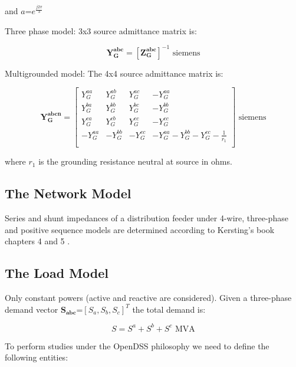\documentclass[12pt]{article}
\begin{document}
and $a$=$e^{\frac{j 2  \pi}{3}}$

Three phase model: 3x3 source admittance matrix is:

\begin{equation}
\mathbf{Y^{abc}_{G}}=[\mathbf{Z^{abc}_{G}}]^{-1} \mbox{ siemens}
\end{equation}

Multigrounded model: The 4x4 source admittance matrix is:

\begin{equation}
\mathbf{Y^{abcn}_{G}}=\left[ \begin{array}{cccc}
               {Y}^{aa}_{G}  & {Y}^{ab}_{G}   &{Y}^{ac}_{G}  & -{Y}^{aa}_{G}\\
               {Y}^{ba}_{G} & {Y}^{bb}_{G}  &{Y}^{bc}_{G} & -{Y}^{bb}_{G}\\
               {Y}^{ca}_{G} & {Y}^{cb}_{G}  &{Y}^{cc}_{G} & -{Y}^{cc}_{G}\\
              -{Y}^{aa}_{G} & -{Y}^{bb}_{G} &-{Y}^{cc}_{G} & -{Y}^{aa}_{G}-{Y}^{bb}_{G}-{Y}^{cc}_{G}-\frac{1}{r_1}\\
             \end{array}
           \right] \mbox{ siemens}
           \end{equation}

where $r_1$ is the grounding resistance neutral at source in ohms. 

\subsection{The Network Model}

Series and shunt impedances of a distribution feeder under 4-wire, three-phase and positive sequence models
are determined according to Kersting's book chapters 4 and 5 \cite{2}.
 
\subsection{The Load Model}

Only constant powers (active and reactive are considered). Given a three-phase demand vector $\mathbf{S_{abc}}$=$[{S}_{a},{S}_{b},{S}_{c}]^T$ the total demand is:

\begin{equation}
  {S}={S}^{a}+{S}^{b}+{S}^{c}\mbox{ MVA}
\end{equation}

To perform studies under the OpenDSS philosophy we need to define the following entities:
\end{document}
